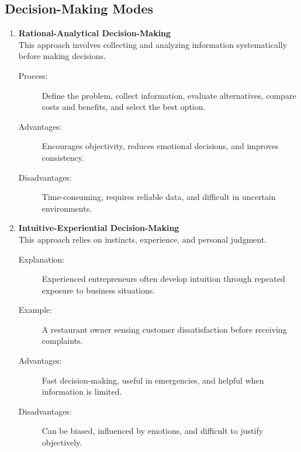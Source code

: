 \documentclass[12pt,a4paper]{article}
\begin{document}
\subsection*{Decision-Making Modes}

\begin{enumerate}
    \item \textbf{Rational-Analytical Decision-Making} \\
    This approach involves collecting and analyzing information systematically before making decisions.
    \begin{description}
        \item[Process:] Define the problem, collect information, evaluate alternatives, compare costs and benefits, and select the best option.
        \item[Advantages:] Encourages objectivity, reduces emotional decisions, and improves consistency.
        \item[Disadvantages:] Time-consuming, requires reliable data, and difficult in uncertain environments.
    \end{description}

    \item \textbf{Intuitive-Experiential Decision-Making} \\
    This approach relies on instincts, experience, and personal judgment.
    \begin{description}
        \item[Explanation:] Experienced entrepreneurs often develop intuition through repeated exposure to business situations.
        \item[Example:] A restaurant owner sensing customer dissatisfaction before receiving complaints.
        \item[Advantages:] Fast decision-making, useful in emergencies, and helpful when information is limited.
        \item[Disadvantages:] Can be biased, influenced by emotions, and difficult to justify objectively.
    \end{description}


\end{enumerate}
\end{document}
